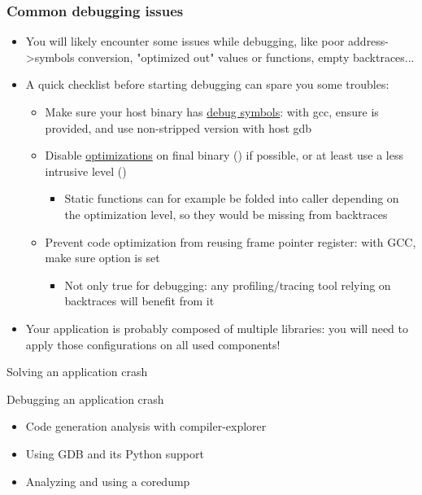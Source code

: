 \begin{frame}[fragile]
  \frametitle{Common debugging issues}
  \begin{itemize}
    \item You will likely encounter some issues while debugging, like poor address->symbols conversion, "optimized out" values or functions, empty backtraces...
    \item A quick checklist before starting debugging can spare you some troubles:
    \begin{itemize}
      \item Make sure your host binary has \href{https://gcc.gnu.org/onlinedocs/gcc/Debugging-Options.html}{debug symbols}: with gcc, ensure  is provided, and use non-stripped version with host gdb
      \item Disable \href {https://gcc.gnu.org/onlinedocs/gcc-4.9.2/gcc/Optimize-Options.html}{optimizations} on final binary () if possible, or at least use a less intrusive level ()
      \begin {itemize}
        \item Static functions can for example be folded into caller depending on the optimization level, so they would be missing from backtraces
    \end{itemize}
      \item Prevent code optimization from reusing frame pointer register: with GCC, make sure  option is set
        \begin{itemize}
          \item Not only true for debugging: any profiling/tracing tool relying on backtraces will benefit from it
        \end{itemize}
    \end{itemize}
    \item Your application is probably composed of multiple libraries: you will need to apply those configurations on all used components!
  \end{itemize}
\end{frame}

\setuplabframe
{Solving an application crash}
{
  Debugging an application crash
  \begin{itemize}
    \item Code generation analysis with compiler-explorer
    \item Using GDB and its Python support
    \item Analyzing and using a coredump
  \end{itemize}
}
